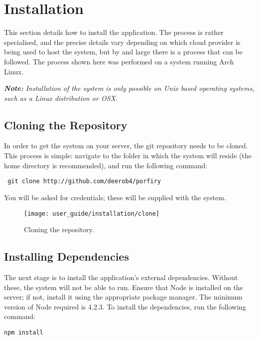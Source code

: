 \section{Installation} %
\label{sec:installation}
This section details how to install the application. The process is rather specialised, and the precise details vary depending on which cloud provider is being used to host the system, but by and large there is a process that can be followed. The process shown here was performed on a system running Arch Linux.

\textit{\textbf{Note:} Installation of the system is only possible on Unix based operating systems, such as a Linux distribution or OSX.}

\subsection{Cloning the Repository} %
\label{sub:cloning_the_repository}
In order to get the system on your server, the git repository needs to be cloned. This process is simple: navigate to the folder in which the system will reside (the home directory is recommended), and run the following command:

\begin{verbatim} git clone http://github.com/deerob4/porfiry \end{verbatim}

You will be asked for credentials; these will be supplied with the system.

\begin{figure}[h!]
  \centering
  \texttt{[image: user\_guide/installation/clone]}
  \caption{Cloning the repository.}
\end{figure}

\subsection{Installing Dependencies} %
\label{sub:installing_dependencies}
The next stage is to install the application's external dependencies. Without these, the system will not be able to run. Ensure that Node is installed on the server; if not, install it using the appropriate package manager. The minimum version of Node required is 4.2.3. To install the dependencies, run the following command:

\begin{verbatim}npm install\end{verbatim}


